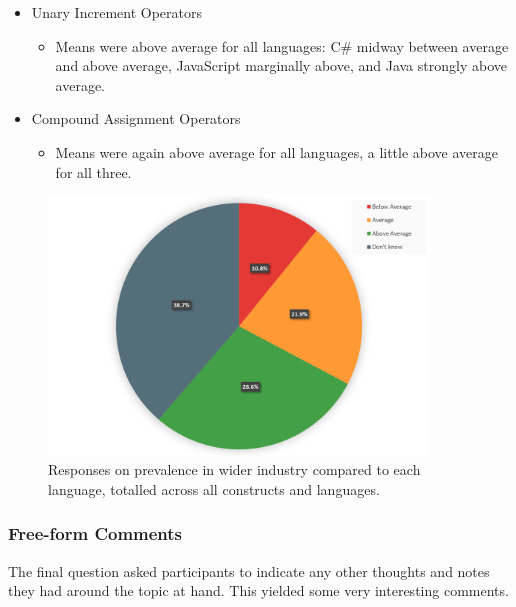 \documentclass{article}
\begin{document}
\begin{itemize}
                \item Unary Increment Operators
                \begin{itemize}
                    \item Means were above average for all languages: C\# midway between average and above average, JavaScript marginally above, and Java strongly above average.                
                \end{itemize}
                \item Compound Assignment Operators
                \begin{itemize}
                    \item Means were again above average for all languages, a little above average for all three.  
                \end{itemize}
            \end{itemize}

            \begin{figure}[htbp]
                \centering
                \includegraphics[width=0.9\textwidth]{industryPie.png}
                \caption{Responses on prevalence in wider industry compared to each language, totalled across all constructs and languages.}
                \label{fig:indsutryPie}
            \end{figure}            

        \subsubsection{Free-form Comments}
        \label{subsubsec:freeFormComments}
            The final question asked participants to indicate any other thoughts and notes they had around the topic at hand. This yielded some very interesting comments.
\end{document}
